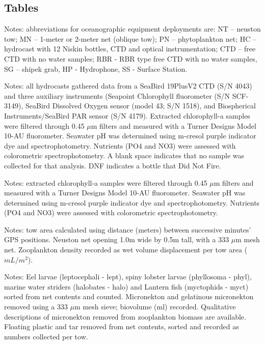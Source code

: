 \documentclass[letterpaper,11pt]{article}
\newcommand{\cruiseID}{S275}
\begin{document}
\clearpage
\begin{landscape}
\subsection*{Tables}

\fontsize{10}{12}\selectfont



\noindent Notes: abbreviations for oceanographic equipment deployments are: NT – neuston tow; MN – 1-meter or 2-meter net (oblique tow); PN – phytoplankton net; HC – hydrocast with 12 Niskin bottles, CTD and optical instrumentation; CTD – free CTD with no water samples; RBR - RBR type free CTD with no water samples, SG – shipek grab, HP - Hydrophone, SS - Surface Station.


\clearpage


\noindent Notes: all hydrocasts gathered data from a SeaBird 19PlusV2 CTD (S/N 4043) and three auxiliary instruments (Seapoint Chlorophyll fluorometer (S/N SCF-3149), SeaBird Dissolved Oxygen sensor (model 43; S/N 1518), and Biospherical Instruments/SeaBird PAR sensor (S/N 4179). Extracted chlorophyll-a samples were filtered through 0.45 $\mu$m filters and measured with a Turner Designs Model 10-AU fluorometer. Seawater pH was determined using m-cresol purple indicator dye and spectrophotometry. Nutrients (PO4 and NO3) were assessed with colorometric spectrophotometry. A blank space indicates that no sample was collected for that analysis. DNF indicates a bottle that Did Not Fire.

\clearpage


\clearpage

\noindent Notes: extracted chlorophyll-a samples were filtered through 0.45 $\mu$m filters and measured with a Turner Designs Model 10-AU fluorometer. Seawater pH was determined using m-cresol purple indicator dye and spectrophotometry. Nutrients (PO4 and NO3) were assessed with colorometric spectrophotometry.

\clearpage

\noindent Notes: tow area calculated using distance (meters) between successive minutes' GPS positions. Neuston net opening 1.0m wide by 0.5m tall, with a 333 $\mu$m mesh net. Zooplankton density recorded as wet volume displacement per tow area ($mL/m^2$).\\

\clearpage

\noindent Notes: Eel larvae (leptocephali - lept), spiny lobster larvae (phyllosoma - phyl), marine water striders (halobates - halo) and Lantern fish (myctophids - myct) sorted from net contents and counted. Micronekton and gelatinous micronekton removed using a 333 $\mu$m mesh sieve; biovolume (ml) recorded. Qualitative descriptions of micronekton removed from zooplankton biomass are available. Floating plastic and tar removed from net contents, sorted and recorded as numbers collected per tow.


\end{landscape}
\end{document}
